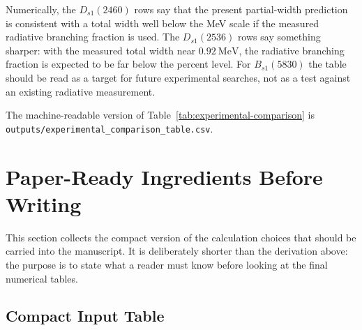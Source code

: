 \documentclass[11pt]{article}
\newcommand{\Dsone}{D_{s1}}
\newcommand{\Bsone}{B_{s1}}
\begin{document}
Numerically, the $\Dsone(2460)$ rows say that the present partial-width
prediction is consistent with a total width well below the MeV scale if the
measured radiative branching fraction is used.  The $\Dsone(2536)$ rows say
something sharper: with the measured total width near $0.92~\mathrm{MeV}$, the
radiative branching fraction is expected to be far below the percent level.  For
$\Bsone(5830)$ the table should be read as a target for future experimental
searches, not as a test against an existing radiative measurement.

The machine-readable version of Table~\ref{tab:experimental-comparison} is
\texttt{outputs/experimental\_comparison\_table.csv}.

\section{Paper-Ready Ingredients Before Writing}

This section collects the compact version of the calculation choices that
should be carried into the manuscript.  It is deliberately shorter than the
derivation above: the purpose is to state what a reader must know before
looking at the final numerical tables.

\subsection{Compact Input Table}
\end{document}
